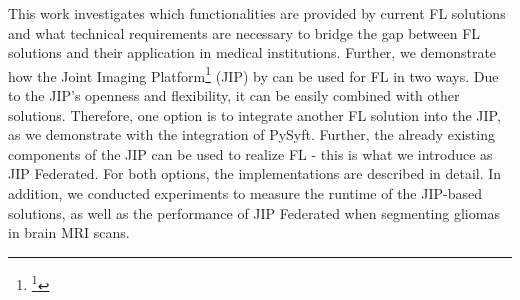 This work investigates which functionalities are provided by current FL solutions and what technical requirements are necessary to bridge the gap between FL solutions and their application in medical institutions. 
Further, we demonstrate how the Joint Imaging Platform\footnote{\footnote{https://jip.dktk.dkfz.de/jiphomepage/}} (JIP) by \cite{Scherer2020JointAnalytics} can be used for FL in two ways.
Due to the JIP's openness and flexibility, it can be easily combined with other solutions. Therefore, one option is to integrate another FL solution into the JIP, as we demonstrate with the integration of PySyft. Further, the already existing components of the JIP can be used to realize FL - this is what we introduce as JIP Federated. For both options, the implementations are described in detail. 
In addition, we conducted experiments to measure the runtime of the JIP-based solutions, as well as the performance of JIP Federated when segmenting gliomas in brain MRI scans.
